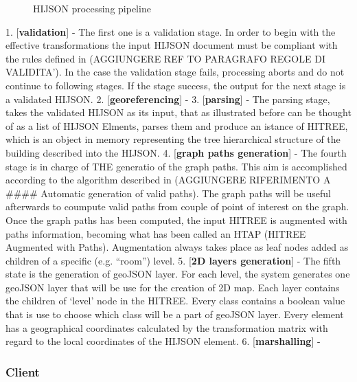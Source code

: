 \documentclass{sig-alternate}
\begin{document}
\begin{figure}
\centering
{}
\caption{HIJSON processing pipeline}
\label{fig:pipeline}
\end{figure}

1. {[}\textbf{validation}{]} - The first one is a validation stage. In
order to begin with the effective transformations the input HIJSON
document must be compliant with the rules defined in (AGGIUNGERE REF TO
PARAGRAFO REGOLE DI VALIDITA'). In the case the validation stage fails,
processing aborts and do not continue to following stages. If the stage
success, the output for the next stage is a validated HIJSON. 2.
{[}\textbf{georeferencing}{]} - 3. {[}\textbf{parsing}{]} - The parsing
stage, takes the validated HIJSON as its input, that as illustrated
before can be thought of as a list of HIJSON Elments, parses them and
produce an istance of HITREE, which is an object in memory representing
the tree hierarchical structure of the building described into the
HIJSON. 4. {[}\textbf{graph paths generation}{]} - The fourth stage is
in charge of THE generatio of the graph paths. This aim is accomplished
according to the algorithm described in (AGGIUNGERE RIFERIMENTO A
\#\#\#\# Automatic generation of valid paths). The graph paths will be
useful afterwards to coumpute valid paths from couple of point of
interest on the graph. Once the graph paths has been computed, the input
HITREE is augmented with paths information, becoming what has been
called an HTAP (HITREE Augmented with Paths). Augmentation always takes
place as leaf nodes added as children of a specific (e.g. ``room'')
level. 5. {[}\textbf{2D layers generation}{]} - The fifth state is the
generation of geoJSON layer. For each level, the system generates one
geoJSON layer that will be use for the creation of 2D map. Each layer
contains the children of `level' node in the HITREE. Every class
contains a boolean value that is use to choose which class will be a
part of geoJSON layer. Every element has a geographical coordinates
calculated by the transformation matrix with regard to the local
coordinates of the HIJSON element. 6. {[}\textbf{marshalling}{]} -

\subsubsection{Client}\label{client}
\end{document}
